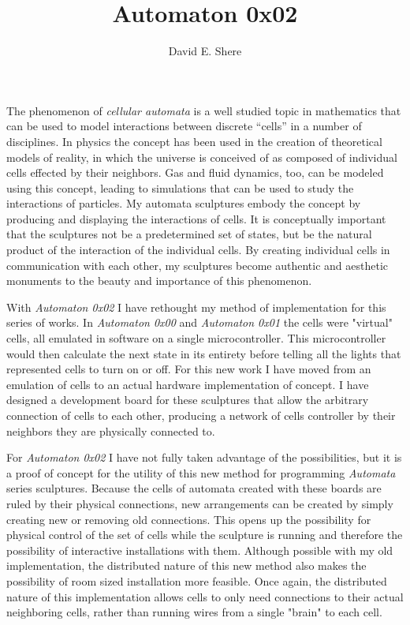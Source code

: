 \documentclass{article}
\title{Automaton 0x02}
\author{David E. Shere}
\begin{document}
\maketitle

The phenomenon of \textit{cellular automata} is a well studied topic in mathematics that can be used to model interactions between discrete ``cells'' in a number of disciplines.
In physics the concept has been used in the creation of theoretical models of reality, in which the universe is conceived of as composed of individual cells effected by their neighbors.
Gas and fluid dynamics, too, can be modeled using this concept, leading to simulations that can be used to study the interactions of particles.
My automata sculptures embody the concept by producing and displaying the interactions of cells.
It is conceptually important that the sculptures not be a predetermined set of states, but be the natural product of the interaction of the individual cells.
By creating individual cells in communication with each other, my sculptures become authentic and aesthetic monuments to the beauty and importance of this phenomenon.

With \textit{Automaton 0x02} I have rethought my method of implementation for this series of works.
In \textit{Automaton 0x00} and \textit{Automaton 0x01} the cells were "virtual" cells, all emulated in software on a single microcontroller.
This microcontroller would then calculate the next state in its entirety before telling all the lights that represented cells to turn on or off.
For this new work I have moved from an emulation of cells to an actual hardware implementation of concept.
I have designed a development board for these sculptures that allow the arbitrary connection of cells to each other, producing a network of cells controller by their neighbors they are physically connected to.

For \textit{Automaton 0x02} I have not fully taken advantage of the possibilities, but it is a proof of concept for the utility of this new method for programming \textit{Automata} series sculptures.
Because the cells of automata created with these boards are ruled by their physical connections, new arrangements can be created by simply creating new or removing old connections.
This opens up the possibility for physical control of the set of cells while the sculpture is running and therefore the possibility of interactive installations with them.
Although possible with my old implementation, the distributed nature of this new method also makes the possibility of room sized installation more feasible.
Once again, the distributed nature of this implementation allows cells to only need connections to their actual neighboring cells, rather than running wires from a single "brain" to each cell.
\end{document}
